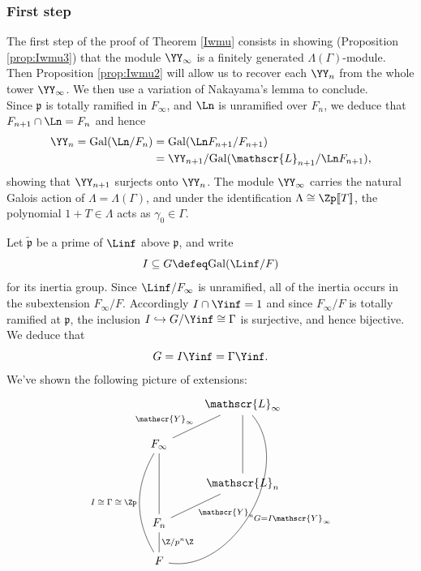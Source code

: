 \documentclass[a4paper,10pt, english, reqno]{smfart}
\newcommand{\lsem}{[\! [}
\newcommand{\rsem}{]\! ]}
\numberwithin{equation}{section}
\begin{document}
\subsubsection{First step}

The first step of the proof of Theorem \ref{Iwmu} consists in showing (Proposition \ref{prop:Iwmu3}) that the module $\YY_{\infty}$ is a finitely generated $\Lambda(\Gamma)$-module. Then Proposition \ref{prop:Iwmu2} will allow us to recover each $\YY_{n}$ from the whole tower $\YY_{\infty}$. We then use a variation of Nakayama's lemma to conclude.\\

Since $\mathfrak{p}$ is totally ramified in $F_\infty$, and $\Ln$ is unramified over $F_n$, we deduce that $F_{n + 1} \cap \Ln = F_n$ and hence  
\begin{align*}
\YY_n = \mathrm{Gal}(\Ln / F_n) &= \mathrm{Gal}(\Ln F_{n+1} / F_{n + 1})\\
&= \YY_{n + 1} / \mathrm{Gal}(\mathscr{L}_{n + 1} / \Ln F_{n+1}),
\end{align*}
showing that $\YY_{n+1}$ surjects onto $\YY_n$. The module $\YY_\infty$ carries the natural Galois action of $\Lambda = \Lambda(\Gamma)$, and under the identification $\Lambda \cong \Zp\lsem T\rsem$, the polynomial $1 + T \in \Lambda$ acts as $\gamma_0 \in \Gamma$.

Let $\tilde{\mathfrak{p}}$ be a prime of $\Linf$ above $\mathfrak{p}$, and write
 \[I \subseteq G \defeq \mathrm{Gal}(\Linf / F)\]
for its inertia group. Since $\Linf / F_\infty$ is unramified, all of the inertia occurs in the subextension $F_\infty/F$. Accordingly $I \cap \Yinf = 1$ and since $F_\infty / F$ is totally ramified at $\mathfrak{p}$, the inclusion $I \hookrightarrow G / \Yinf \cong \Gamma$ is surjective, and hence bijective. We deduce that
\[ G = I \Yinf = \Gamma \Yinf. \]
We've shown the following picture of extensions:
\[
\begin{tikzcd}[every arrow/.append style={dash}]
                     & \mathscr{L}_\infty   & \\
F_\infty \arrow[ur,"\mathscr{Y}_\infty"] & &\\
                              &\mathscr{L}_n \arrow[uu]                  \\
F_n \arrow[uu]\arrow[ur,"\mathscr{Y}_n"']      &                                  \\
F \arrow[u, "\Z/p^n\Z"']\arrow[uuu, bend left, "I \hspace{2pt}\cong \hspace{2pt}\Gamma \hspace{2pt}\cong \hspace{2pt}\Zp"] \arrow[uuuur, bend right = 70, "G = I\mathscr{Y}_\infty"']       &                          
\end{tikzcd}
\]
\end{document}
